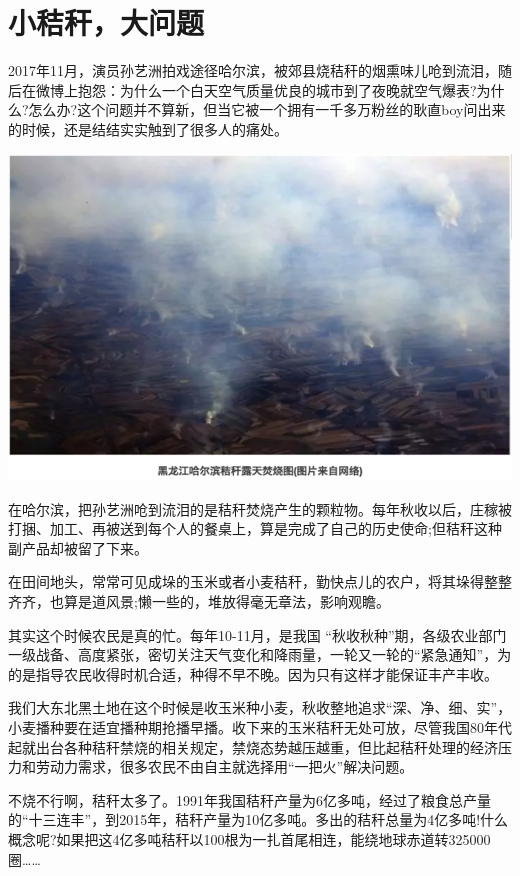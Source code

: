\documentclass[]{book}
\begin{document}
\section{小秸秆，大问题}

2017年11月，演员孙艺洲拍戏途径哈尔滨，被郊县烧秸秆的烟熏味儿呛到流泪，随后在微博上抱怨：为什么一个白天空气质量优良的城市到了夜晚就空气爆表?为什么?怎么办?这个问题并不算新，但当它被一个拥有一千多万粉丝的耿直boy问出来的时候，还是结结实实触到了很多人的痛处。

\includegraphics[width=8.33in]{images/stalk1}

在哈尔滨，把孙艺洲呛到流泪的是秸秆焚烧产生的颗粒物。每年秋收以后，庄稼被打捆、加工、再被送到每个人的餐桌上，算是完成了自己的历史使命;但秸秆这种副产品却被留了下来。

在田间地头，常常可见成垛的玉米或者小麦秸秆，勤快点儿的农户，将其垛得整整齐齐，也算是道风景;懒一些的，堆放得毫无章法，影响观瞻。

其实这个时候农民是真的忙。每年10-11月，是我国
``秋收秋种''期，各级农业部门一级战备、高度紧张，密切关注天气变化和降雨量，一轮又一轮的``紧急通知''，为的是指导农民收得时机合适，种得不早不晚。因为只有这样才能保证丰产丰收。

我们大东北黑土地在这个时候是收玉米种小麦，秋收整地追求``深、净、细、实''，小麦播种要在适宜播种期抢播早播。收下来的玉米秸秆无处可放，尽管我国80年代起就出台各种秸秆禁烧的相关规定，禁烧态势越压越重，但比起秸秆处理的经济压力和劳动力需求，很多农民不由自主就选择用``一把火''解决问题。

不烧不行啊，秸秆太多了。1991年我国秸秆产量为6亿多吨，经过了粮食总产量的``十三连丰''，到2015年，秸秆产量为10亿多吨。多出的秸秆总量为4亿多吨!什么概念呢?如果把这4亿多吨秸秆以100根为一扎首尾相连，能绕地球赤道转325000圈\ldots{}\ldots{}
\end{document}
